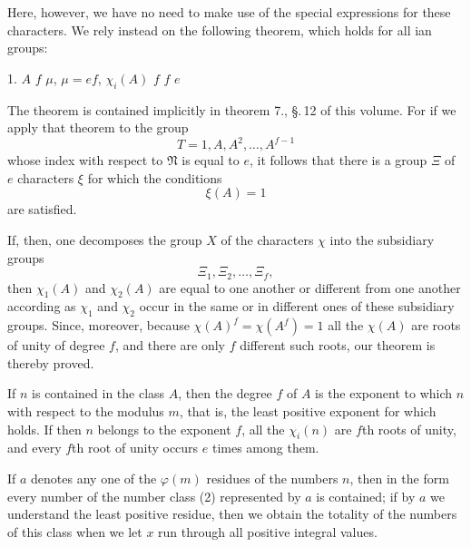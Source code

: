 
Here, however, we have no need to make use of the special expressions for these
characters. We rely instead on the following theorem, which holds for all
ian groups:

1.  $A$  $f$ 
 $\mu$,  $\mu = ef$,
 $\chi_i(A)$  $f$ $f$ $e$

The theorem is contained implicitly in theorem 7., \S.\,12 of this volume. For if we
apply that theorem to the group
\[
T = 1, A, A^2, \ldots, A^{f-1}
\]
whose index with respect to $\mathfrak{N}$ is equal to $e$, it follows that there is
a group $\Xi$ of $e$ characters $\xi$ for which the
conditions
\[
\xi(A) = 1
\]
are satisfied.

If, then, one decomposes the group $X$ of the characters $\chi$ into the subsidiary
groups
\[
\Xi_1, \Xi_2, \ldots, \Xi_f,
\]
then $\chi_1(A)$ and $\chi_2(A)$ are equal to one another or different from one
another according as $\chi_1$ and $\chi_2$ occur in the same or in different ones of
these subsidiary groups. Since, moreover, because
$\chi(A)^f = \chi(A^f) = 1$ all the $\chi(A)$ are roots of unity of degree $f$, and
there are only $f$ different such roots, our theorem is thereby proved.

If $n$ is contained in the class $A$, then the degree $f$ of $A$ is the exponent to
which $n$  with respect to the modulus $m$, that is, the least positive
exponent for which
holds. If then $n$ belongs to the exponent $f$, all the $\chi_i(n)$ are $f$th roots
of unity, and every $f$th root of unity occurs $e$ times among them.

If $a$ denotes any one of the $\varphi(m)$ residues of the numbers $n$, then in the
form
every number of the number class (2) represented by $a$ is contained; if by $a$ we
understand the least positive residue, then we obtain the totality of the numbers of
this class when we let $x$ run through all positive integral values.
